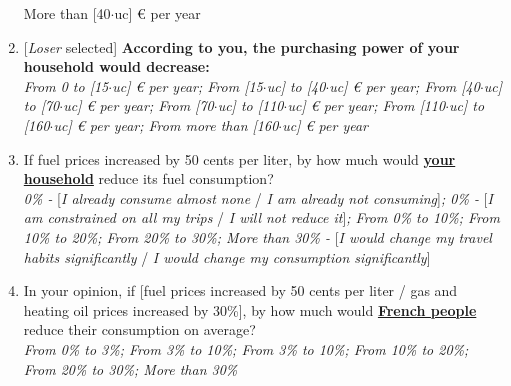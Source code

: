 \documentclass[12pt]{article} %
\begin{document}
\begin{appendices}
\begin{enumerate}[resume,leftmargin=*]
{More than {[}40$\cdot$uc{]} \euro{} per year}
\item {[}\emph{Loser} selected{]} \textbf{According to you, the purchasing
power of your household would decrease:} \emph{}\\
\emph{From 0 to {[}15$\cdot$uc{]} \euro{} per year; From {[}15$\cdot$uc{]}
to {[}40$\cdot$uc{]} \euro{} per year; From {[}40$\cdot$uc{]} to {[}70$\cdot$uc{]}
\euro{} per year; From {[}70$\cdot$uc{]} to {[}110$\cdot$uc{]} \euro{} per year;
From {[}110$\cdot$uc{]} to {[}160$\cdot$uc{]} \euro{} per year; From more
than {[}160$\cdot$uc{]} \euro{} per year}
\item If fuel prices increased by 50 cents per liter, by how much would
\textbf{\underline{your household}} reduce its fuel consumption? \emph{}\\
\emph{0\% -} {[}\emph{I already consume almost none }/\emph{ I am
already not consuming}{]}\emph{; 0\% - }{[}\emph{I am constrained
on all my trips} / \emph{I will not reduce it}{]}\emph{; From 0\%
to 10\%; From 10\% to 20\%; From 20\% to 30\%; More than 30\% - }{[}\emph{I
would change my travel habits significantly }/ \emph{I would change
my consumption significantly}{]}
\item In your opinion, if {[}fuel prices increased by 50 cents per liter
/ gas and heating oil prices increased by 30\%{]}, by how much would
\textbf{\underline{French people}} reduce their consumption on average?
\emph{}\\
\emph{From 0\% to 3\%; From 3\% to 10\%; From 3\% to 10\%; From 10\%
to 20\%; From 20\% to 30\%; More than 30\%} 
\end{enumerate}


\end{appendices}
\end{document}
